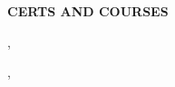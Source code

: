%
%
%
%
%



\vspace{\spaceBeforeSection}
\textbf{CERTS AND COURSES} \hrulefill
\vspace{\spaceAfterSection}


    \href{\certScrumMasterUrl}{\certScrumMasterBreak} 

    \begin{small}
        \certScrumMasterWho, \ \certScrumMasterWhen
    \end{small}


    \medskip

    \href{\certCookiesUrl}{\certCookiesBreak}

    \begin{small}
        \certCookiesWho, \ \certCookiesWhen
    \end{small}

    
